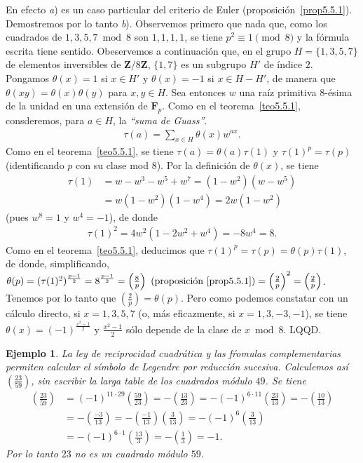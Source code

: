\documentclass[bibtotoc,leqno,spanish]{amsbook}
\newcommand{\ZZ}{\mathbf{Z}}
\newcommand{\FF}{\mathbf{F}}
\newcommand{\QED}{LQQD.}
\newcommand{\leg}[2]{\left(\frac{#1}{#2}\right)}
\numberwithin{equation}{section}
\theoremstyle{note}
\theoremstyle{note}
\theoremstyle{rem}
\newtheorem*{example*}{Ejemplo}
\newtheorem*{remark*}{Observaci\'on}
\numberwithin{theorem}{section}
\numberwithin{proposition}{section}
\numberwithin{definition}{section}
\numberwithin{lemma}{section}
\numberwithin{corollary}{section}
\numberwithin{example}{section}
\numberwithin{footnote}{section}%
\begin{document}
En efecto {\itshape a}) es un caso particular del criterio de Euler (proposici\'on~\ref{prop5.5.1}).
Demostremos por lo tanto
{\itshape b}). Observemos primero que nada que, como los cuadrados de $1, 3, 5, 7\bmod 8$ son $1,1,1,1$,
se tiene $p^{2}\equiv 1\pmod 8$ y la f\'ormula escrita tiene sentido. Obeservemos a continuaci\'on
que, en el grupo $H = \{1,3,5,7\}$ de elementos inversibles de $\ZZ/8\ZZ$, $\{1,7\}$ es un subgrupo
$H'$ de \'indice $2$. Pongamos $\theta(x) = 1$ si $x\in H'$ y $\theta(x) = -1$ si $x\in H-H'$, de manera
que $\theta(xy) = \theta(x)\theta(y)$ para $x,y\in H$. Sea entonces $w$ una ra\'iz primitiva $8$-\'esima
de la unidad en una extensi\'on de $\FF_{p}$. Como en el teorema~\ref{teo5.5.1},
consderemos, para $a\in H$, la {\em ``suma de Guass''}.
\begin{gather}
\tau(a) = \sum_{x\in H}\theta(x)w^{ax}.
\end{gather}
Como en el teorema~\ref{teo5.5.1}, se tiene $\tau(a) = \theta(a)\tau(1)$ y $\tau(1)^{p}=\tau(p)$ (identificando
$p$ con su clase mod $8$). Por la definici\'on de $\theta(x)$, se tiene
\begin{align*}
\tau(1) &= w-w^{3}-w^{5}+w^{7}=(1-w^{2})(w-w^{5})\\
&= w(1-w^{2})(1-w^{4})=2w(1-w^{2})
\end{align*}
(pues $w^{8}=1$ y $w^{4}=-1$), de donde
\begin{gather*}
\tau(1)^{2}=4w^{2}(1-2w^{2}+w^{4})=-8w^{4}=8.
\end{gather*}
Como en el teorema~\ref{teo5.5.1}, deducimos que $\tau(1)^{p}=\tau(p) = \theta(p)\tau(1)$, de donde, simplificando,
$\theta(p) = (\tau(1)^{2})^{\frac{p-1}{2}}=8^{\frac{p-1}{2}}=\leg{8}{p}
\text{ (proposici\'on~\ref{prop5.5.1})}=
\leg{2}{p}^{2}=\leg{2}{p}$. Tenemos por lo tanto que $\leg{2}{p} = \theta(p)$. Pero como podemos
constatar con un c\'alculo directo, si $x=1,3,5,7$ (o, m\'as eficazmente, si $x = 1,3,-3,-1$), se
tiene $\theta(x) = (-1)^{\frac{x^{2}-1}{2}}$ y $\frac{x^{2}-1}{2}$ s\'olo depende de la clase de $x\bmod 8$. \QED

\begin{example*}
La ley de reciprocidad cuadr\'atica y las f\'romulas complementarias permiten calcular el s\'imbolo de Legendre por
reducci\'on sucesiva. Calculemos as\'i $\leg{23}{59}$, sin escribir la larga table de los cuadrados
m\'odulo $49$. Se tiene
\begin{align*}
\leg{23}{59} &= (-1)^{11\cdot 29}\leg{59}{23} = -\leg{13}{23} = -(-1)^{6\cdot 11}\leg{23}{13}=-\leg{10}{13}\\
&= -\leg{-3}{13} = -\leg{-1}{13}\leg{3}{13} =-(-1)^{6}\leg{3}{13}\\
&=-(-1)^{6\cdot 1}\leg{13}{3}=-\leg{1}{3}=-1.
\end{align*}
Por lo tanto $23$ no es un cuadrado m\'odulo $59$.
\end{example*}
\end{document}
